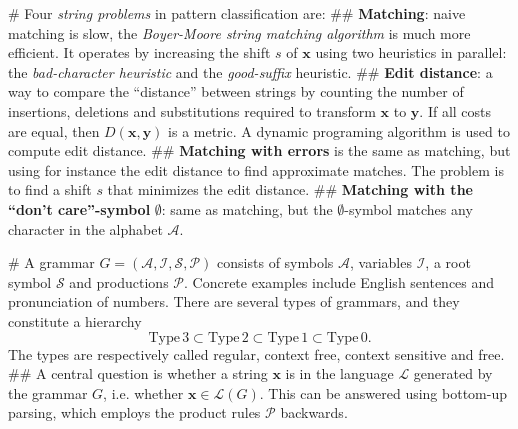 \documentclass[12pt, a4paper]{article}
\newcommand{\vect}[1]{\bm{#1}}
\begin{document}
\begin{easylist}[itemize]
# Four \emph{string problems} in pattern classification are:
## \textbf{Matching}: naive matching is slow, the \emph{Boyer-Moore string matching algorithm} is much more efficient.
It operates by increasing the shift $s$ of $\vect{x}$ using two heuristics in parallel: the \emph{bad-character heuristic} and the \emph{good-suffix} heuristic.
## \textbf{Edit distance}: a way to compare the ``distance'' between strings by counting the number of insertions, deletions and substitutions required to transform $\vect{x}$ to $\vect{y}$.
If all costs are equal, then $D(\vect{x}, \vect{y})$ is a metric.
A dynamic programing algorithm is used to compute edit distance.
## \textbf{Matching with errors} is the same as matching, but using for instance the edit distance to find approximate matches. 
The problem is to find a shift $s$ that minimizes the edit distance.
## \textbf{Matching with the ``don't care''-symbol} $\emptyset$: same as matching, but the $\emptyset$-symbol matches any character in the alphabet $\mathcal{A}$.

# A grammar $G = (\mathcal{A}, \mathcal{I}, \mathcal{S}, \mathcal{P})$ consists of symbols $\mathcal{A}$, variables $\mathcal{I}$, a root symbol $\mathcal{S}$ and productions $\mathcal{P}$.
Concrete examples include English sentences and pronunciation of numbers.
There are several types of grammars, and they constitute a hierarchy
\begin{equation*}
	\text{Type} \, 3 \subset \text{Type} \, 2 \subset \text{Type} \, 1 \subset \text{Type} \, 0. 
\end{equation*}
The types are respectively called regular, context free, context sensitive and free.
## A central question is whether a string $\vect{x}$ is in the language $\mathcal{L}$ generated by the grammar $G$, i.e. whether $\vect{x} \in \mathcal{L}(G)$. This can be answered using bottom-up parsing, which employs the product rules $\mathcal{P}$ backwards.
\end{easylist}
\end{document}
